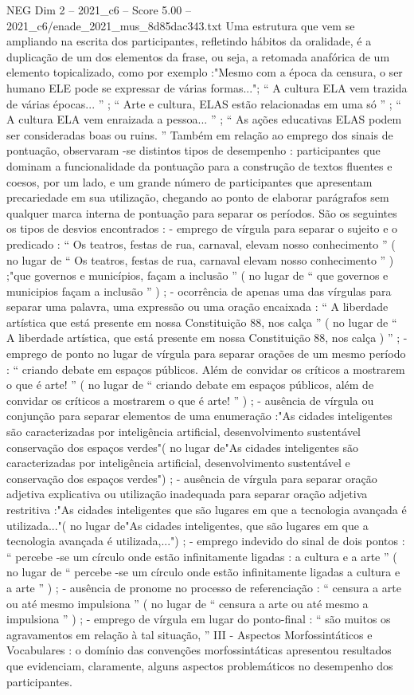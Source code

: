\begin{textsample}{NEG Dim 2 – 2021\_c6 – Score 5.00 – 2021\_c6/enade\_2021\_mus\_8d85dac343.txt}
Uma estrutura que vem se ampliando na escrita dos participantes, refletindo hábitos da oralidade, é a duplicação de um dos elementos da frase, ou seja, a retomada anafórica de um elemento topicalizado, como por exemplo :"Mesmo com a época da censura, o ser humano ELE pode se expressar de várias formas..."; “ A cultura ELA vem trazida de várias épocas... ” ; “ Arte e cultura, ELAS estão relacionadas em uma só ” ; “ A cultura ELA vem enraizada a pessoa... ” ; “ As ações educativas ELAS podem ser consideradas boas ou ruins. ” Também em relação ao emprego dos sinais de pontuação, observaram -se distintos tipos de desempenho : participantes que dominam a funcionalidade da pontuação para a construção de textos fluentes e coesos, por um lado, e um grande número de participantes que apresentam precariedade em sua utilização, chegando ao ponto de elaborar parágrafos sem qualquer marca interna de pontuação para separar os períodos.
São os seguintes os tipos de desvios encontrados : - emprego de vírgula para separar o sujeito e o predicado : “ Os teatros, festas de rua, carnaval, elevam nosso conhecimento ” ( no lugar de “ Os teatros, festas de rua, carnaval elevam nosso conhecimento ” ) ;"que governos e municípios, façam a inclusão ” ( no lugar de “ que governos e municipios façam a inclusão ” ) ; - ocorrência de apenas uma das vírgulas para separar uma palavra, uma expressão ou uma oração encaixada : “ A liberdade artística que está presente em nossa Constituição 88, nos calça ” ( no lugar de “ A liberdade artística, que está presente em nossa Constituição 88, nos calça ) ” ; - emprego de ponto no lugar de vírgula para separar orações de um mesmo período : “ criando debate em espaços públicos.
Além de convidar os críticos a mostrarem o que é arte! ” ( no lugar de “ criando debate em espaços públicos, além de convidar os críticos a mostrarem o que é arte! ” ) ; - ausência de vírgula ou conjunção para separar elementos de uma enumeração :"As cidades inteligentes são caracterizadas por inteligência artificial, desenvolvimento sustentável conservação dos espaços verdes"( no lugar de"As cidades inteligentes são caracterizadas por inteligência artificial, desenvolvimento sustentável e conservação dos espaços verdes") ; - ausência de vírgula para separar oração adjetiva explicativa ou utilização inadequada para separar oração adjetiva restritiva :"As cidades inteligentes que são lugares em que a tecnologia avançada é utilizada..."( no lugar de"As cidades inteligentes, que são lugares em que a tecnologia avançada é utilizada,...") ; - emprego indevido do sinal de dois pontos : “ percebe -se um círculo onde estão infinitamente ligadas : a cultura e a arte ” ( no lugar de “ percebe -se um círculo onde estão infinitamente ligadas a cultura e a arte ” ) ; - ausência de pronome no processo de referenciação : “ censura a arte ou até mesmo impulsiona ” ( no lugar de “ censura a arte ou até mesmo a impulsiona ” ) ; - emprego de vírgula em lugar do ponto-final : “ são muitos os agravamentos em relação à tal situação, ” III - Aspectos Morfossintáticos e Vocabulares : o domínio das convenções morfossintáticas apresentou resultados que evidenciam, claramente, alguns aspectos problemáticos no desempenho dos participantes.

\end{textsample}
